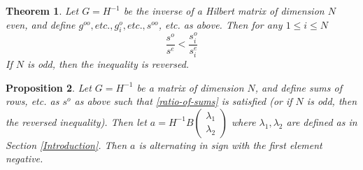 \documentclass{article}
\newtheorem{thm}{Theorem}[section]
\newtheorem{prop}[thm]{Proposition}
\theoremstyle{definition}
\theoremstyle{remark}
\numberwithin{equation}{section}
\begin{document}
\begin{thm}\label{ratio-of-sums-equivalent-theorem}
Let $G=H^{-1}$ be the inverse of a Hilbert matrix of dimension $N$ even, and define $g^{oo}, etc., g^{o}_i, etc., s^{oo}$, etc. as above. Then for any $1 \le i \le N$
\begin{equation}\label{ratio-of-sums}
\frac{s^o}{s^e} < \frac{s_i^o}{s_i^e}
\end{equation} If $N$ is odd, then the inequality is reversed. 
\end{thm}

\begin{prop}\label{ratio-of-sums-is-equivalent-to-positivity-of-coefficients}
Let $G=H^{-1}$ be a matrix of dimension $N$, and define sums of rows, etc. as $s^{o}$ as above such that \ref{ratio-of-sums} is satisfied (or if $N$ is odd, then the reversed inequality). Then let $a = H^{-1} B \begin{pmatrix} \lambda_1 \\ \lambda_2 \end{pmatrix}$ where $\lambda_1, \lambda_2$ are defined as in Section \ref{Introduction}. Then $a$ is alternating in sign with the first element negative. 
\end{prop}
\end{document}
